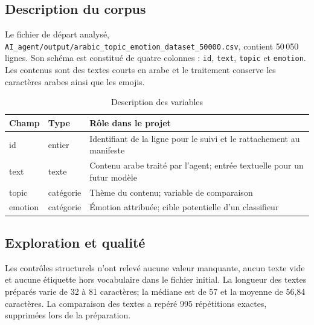 \documentclass[11pt,a4paper]{article}
\begin{document}
\subsection{Description du corpus}
Le fichier de départ analysé, \texttt{AI\_agent/output/arabic\_topic\_emotion\_dataset\_50000.csv}, contient 50\,050 lignes. Son schéma est constitué de quatre colonnes : \texttt{id}, \texttt{text}, \texttt{topic} et \texttt{emotion}. Les contenus sont des textes courts en arabe et le traitement conserve les caractères arabes ainsi que les emojis.

\begin{table}[H]
\centering
\caption{Description des variables}
\begin{tabularx}{\linewidth}{>{\ttfamily}l l X}
\toprule
Champ & Type & Rôle dans le projet \\
\midrule
id & entier & Identifiant de la ligne pour le suivi et le rattachement au manifeste \\
text & texte & Contenu arabe traité par l'agent; entrée textuelle pour un futur modèle \\
topic & catégorie & Thème du contenu; variable de comparaison \\
emotion & catégorie & Émotion attribuée; cible potentielle d'un classifieur \\
\bottomrule
\end{tabularx}
\end{table}

\subsection{Exploration et qualité}
Les contrôles structurels n'ont relevé aucune valeur manquante, aucun texte vide et aucune étiquette hors vocabulaire dans le fichier initial. La longueur des textes préparés varie de 32 à 81 caractères; la médiane est de 57 et la moyenne de 56,84 caractères. La comparaison des textes a repéré 995 répétitions exactes, supprimées lors de la préparation.
\end{document}
